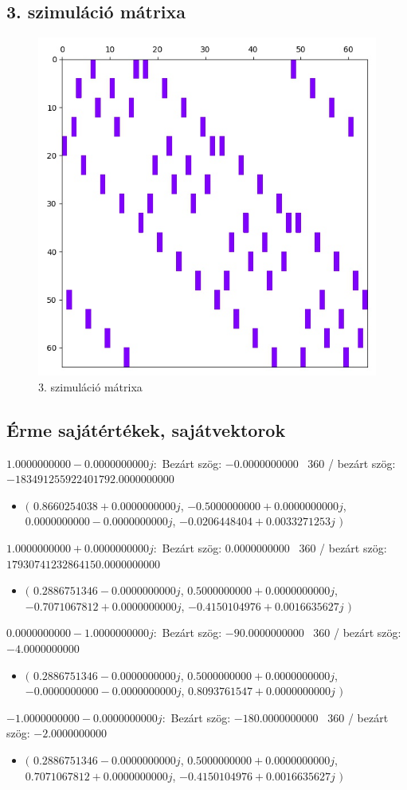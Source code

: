 \documentclass[14pt,a4paper]{article}
\begin{document}
\subsection{3. szimuláció mátrixa}
\begin{figure}[H]
\centering
\includegraphics[width = 0.7\columnwidth]{sim_03/simulation_matrix.jpg}
\caption{3. szimuláció mátrixa}
\end{figure}
\subsection{Érme sajátértékek, sajátvektorok}
$1.0000000000-0.0000000000j$:\
Bezárt szög: $-0.0000000000$ \
360 / bezárt szög: $-183491255922401792.0000000000$\
\begin{itemize}
\item
$\big($
$0.8660254038+0.0000000000j$, $-0.5000000000+0.0000000000j$, $0.0000000000-0.0000000000j$, $-0.0206448404+0.0033271253j$
$\big)$
\end{itemize}
$1.0000000000+0.0000000000j$:\
Bezárt szög: $0.0000000000$ \
360 / bezárt szög: $17930741232864150.0000000000$\
\begin{itemize}
\item
$\big($
$0.2886751346-0.0000000000j$, $0.5000000000+0.0000000000j$, $-0.7071067812+0.0000000000j$, $-0.4150104976+0.0016635627j$
$\big)$
\end{itemize}
$0.0000000000-1.0000000000j$:\
Bezárt szög: $-90.0000000000$ \
360 / bezárt szög: $-4.0000000000$\
\begin{itemize}
\item
$\big($
$0.2886751346-0.0000000000j$, $0.5000000000+0.0000000000j$, $-0.0000000000-0.0000000000j$, $0.8093761547+0.0000000000j$
$\big)$
\end{itemize}
$-1.0000000000-0.0000000000j$:\
Bezárt szög: $-180.0000000000$ \
360 / bezárt szög: $-2.0000000000$\
\begin{itemize}
\item
$\big($
$0.2886751346-0.0000000000j$, $0.5000000000+0.0000000000j$, $0.7071067812+0.0000000000j$, $-0.4150104976+0.0016635627j$
$\big)$
\end{itemize}
\end{document}
